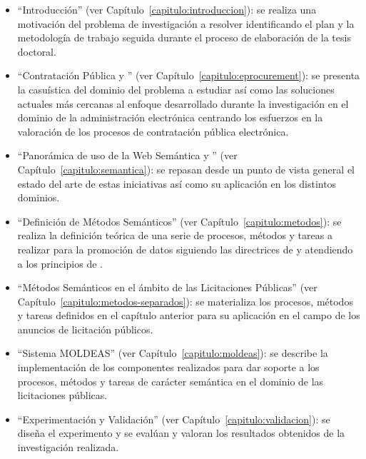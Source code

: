 \begin{itemize}
\item ``Introducción'' (ver Capítulo~\ref{capitulo:introduccion}): se realiza
una motivación del problema de investigación a resolver identificando el plan
y la metodología de trabajo seguida durante el proceso de elaboración
de la tesis doctoral.

\item ``Contratación Pública y \eproc'' (ver Capítulo~\ref{capitulo:eprocurement}): se 
presenta la casuística del dominio del problema a estudiar así como las soluciones
actuales más cercanas al enfoque desarrollado durante la investigación en el dominio
de la administración electrónica centrando los esfuerzos en la valoración
de los procesos de contratación pública electrónica.

\item ``Panorámica de uso de la Web Semántica y \linkeddata'' (ver Capítulo~\ref{capitulo:semantica}): se
repasan desde un punto de vista general el estado del arte de estas iniciativas así como
su aplicación en los distintos dominios.

\item ``Definición de Métodos Semánticos'' (ver Capítulo~\ref{capitulo:metodos}): se realiza
la definición teórica de una serie de procesos, métodos y tareas a realizar para la promoción
de datos siguiendo las directrices de \linkeddata y atendiendo a los principios
de \opendata.

\item ``Métodos Semánticos en el ámbito de las Licitaciones Públicas'' (ver Capítulo~\ref{capitulo:metodos-separados}): se materializa
los procesos, métodos y tareas definidos en el capítulo anterior para su aplicación en el campo
de los anuncios de licitación públicos.


\item ``Sistema MOLDEAS'' (ver Capítulo~\ref{capitulo:moldeas}): se describe la implementación
de los componentes realizados para dar soporte a los procesos, métodos y tareas de carácter
semántica en el dominio de las licitaciones públicas.


\item ``Experimentación y Validación'' (ver Capítulo~\ref{capitulo:validacion}): se diseña
el experimento y se evalúan y valoran los resultados obtenidos de la investigación realizada.




\end{itemize}
